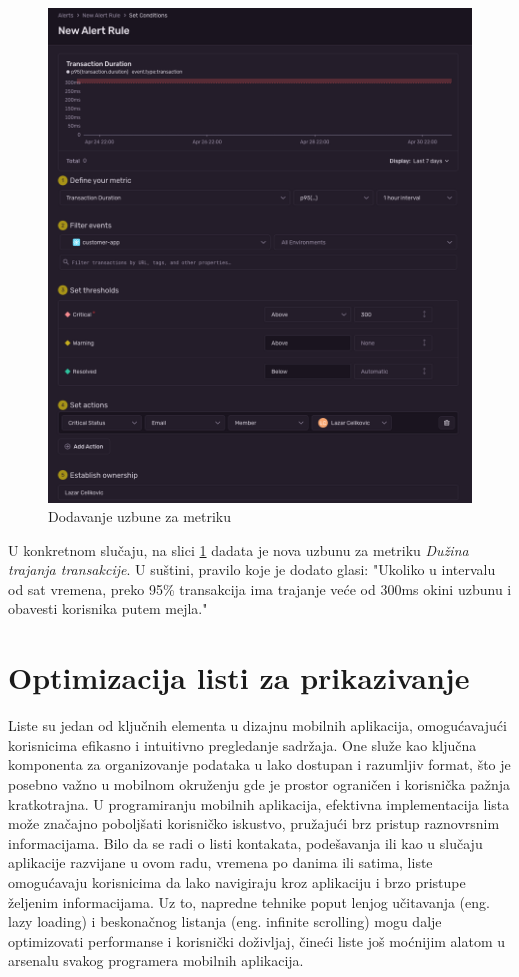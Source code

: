 \documentclass[12pt,oneside]{memoir}
\begin{document}
\begin{figure}
    \centering
    \includegraphics[scale=0.3]{docs/images/chapterFive/addRule.png}
    \caption{Dodavanje uzbune za metriku}
    \label{fig:addRuleForMetric}
\end{figure}

U konkretnom slučaju, na slici \ref{fig:addRuleForMetric} dadata je nova uzbunu za metriku \textit{Dužina trajanja transakcije}. U suštini, pravilo koje je dodato glasi: "Ukoliko u intervalu od sat vremena, preko 95\% transakcija ima trajanje veće od 300ms okini uzbunu i obavesti korisnika putem mejla."

\section{Optimizacija listi za prikazivanje}

Liste su jedan od ključnih elementa u dizajnu mobilnih aplikacija, omogućavajući korisnicima efikasno i intuitivno pregledanje sadržaja. One služe kao ključna komponenta za organizovanje podataka u lako dostupan i razumljiv format, što je posebno važno u mobilnom okruženju gde je prostor ograničen i korisnička pažnja kratkotrajna. U programiranju mobilnih aplikacija, efektivna implementacija lista može značajno poboljšati korisničko iskustvo, pružajući brz pristup raznovrsnim informacijama. Bilo da se radi o listi kontakata, podešavanja ili kao u slučaju aplikacije razvijane u ovom radu, vremena po danima ili satima, liste omogućavaju korisnicima da lako navigiraju kroz aplikaciju i brzo pristupe željenim informacijama. Uz to, napredne tehnike poput lenjog učitavanja (eng. lazy loading) i beskonačnog listanja (eng. infinite scrolling) mogu dalje optimizovati performanse i korisnički doživljaj, čineći liste još moćnijim alatom u arsenalu svakog programera mobilnih aplikacija.
\end{document}
